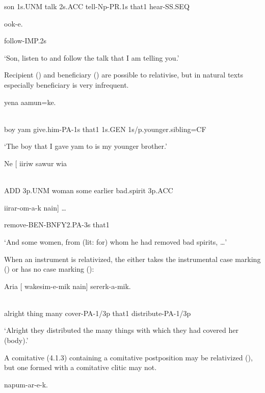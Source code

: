 son  1s.UNM  talk  2s.ACC  tell-Np-PR.1s  that1  hear-SS.SEQ

ook-e.

follow-IMP.2s

`Son, listen to and follow the talk that I am telling you.'

Recipient () and beneficiary () are possible to relativise, but in natural texts especially beneficiary is very infrequent.

\ea%
\label{ex:x1539}
  yena  aamun=ke. \\
      \\
\glt
\z

boy  yam  give.him-PA-1s  that1  1s.GEN  1s/p.younger.sibling=CF

`The boy that I gave yam to is my younger brother.'

\ea%
\label{ex:x1547}
\gll Ne  [    iiriw  sawur  wia \\
      \\
\glt
\z

ADD  3p.UNM  woman  some  earlier  bad.spirit  3p.ACC

iirar-om-a-k  nain]  {\dots}

remove-BEN-BNFY2.PA-3s  that1

`And some women, from (lit: for) whom he had removed bad spirits, {\dots}'

When an instrument is relativized, the  either takes the instrumental case marking () or has no case marking (): 

\ea%
\label{ex:x1553}
\gll Aria  [  wakesim-e-mik  nain]  sererk-a-mik. \\
      \\
\glt
\z

alright  thing  many  cover-PA-1/3p  that1  distribute-PA-1/3p

`Alright they distributed the many things with which they had covered her (body).'

A comitative  (4.1.3) containing a comitative postposition may be relativized (), but one formed with a comitative clitic may not. 

\ea%
\label{ex:x1542}
  napum-ar-e-k. \\
      \\
\glt
\z

